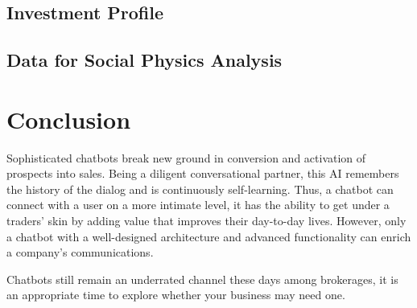\documentclass[	DIV=calc,%
							paper=letter,%
							fontsize=12pt%
                            ]{scrartcl}	 					%
\begin{document}
\subsection{\label{sec:level1}Investment Profile}
\subsection{\label{sec:level1}Data for Social Physics Analysis}

\section{\label{sec:level1}Conclusion}
Sophisticated chatbots break new ground in conversion and activation of prospects into sales. Being a diligent conversational partner, this AI remembers the history of the dialog and is continuously self-learning. Thus, a chatbot can connect with a user on a more intimate level, it has the ability to get under a traders’ skin by adding value that improves their day-to-day lives. However, only a chatbot with a well-designed architecture and advanced functionality can enrich a company’s communications. 

Chatbots still remain an underrated channel these days among brokerages, it is an appropriate time to explore whether your business may need one.
\newpage


\end{document}
